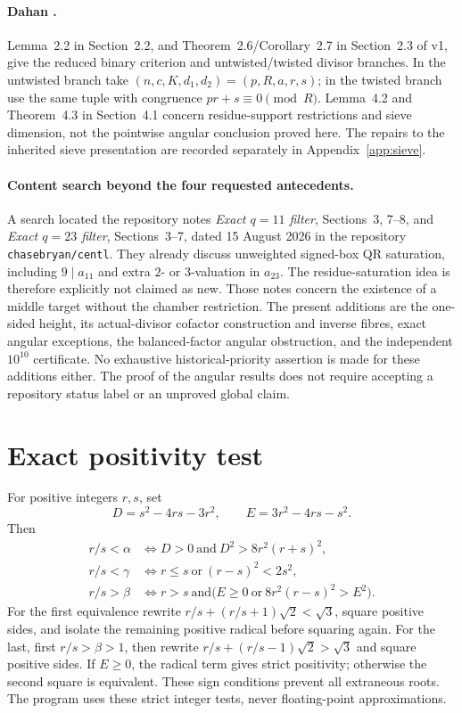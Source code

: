 \documentclass[11pt]{article}
\theoremstyle{definition}\newtheorem{definition}[theorem]{Definition}
\theoremstyle{remark}\newtheorem{remark}[theorem]{Remark}
\begin{document}
\paragraph{Dahan \cite{Dahan}.}
Lemma~2.2 in Section~2.2, and Theorem~2.6/Corollary~2.7 in Section~2.3 of v1, give the reduced binary criterion and untwisted/twisted divisor branches. In the untwisted branch take $(n,c,K,d_1,d_2)=(p,R,a,r,s)$; in the twisted branch use the same tuple with congruence $pr+s\equiv0\pmod R$. Lemma~4.2 and Theorem~4.3 in Section~4.1 concern residue-support restrictions and sieve dimension, not the pointwise angular conclusion proved here. The repairs to the inherited sieve presentation are recorded separately in Appendix~\ref{app:sieve}.

\paragraph{Content search beyond the four requested antecedents.}
A search located the repository notes \cite{Repo11,Repo23} \emph{Exact $q=11$ filter}, Sections~3, 7--8, and \emph{Exact $q=23$ filter}, Sections~3--7, dated 15 August 2026 in the repository \texttt{chasebryan/centl}. They already discuss unweighted signed-box QR saturation, including $9\mid a_{11}$ and extra $2$- or $3$-valuation in $a_{23}$. The residue-saturation idea is therefore explicitly not claimed as new. Those notes concern the existence of a middle target without the chamber restriction. The present additions are the one-sided height, its actual-divisor cofactor construction and inverse fibres, exact angular exceptions, the balanced-factor angular obstruction, and the independent $10^{10}$ certificate. No exhaustive historical-priority assertion is made for these additions either. The proof of the angular results does not require accepting a repository status label or an unproved global claim.

\appendix
\section{Exact positivity test}\label{app:positivity}
For positive integers $r,s$, set
\[
 D=s^2-4rs-3r^2,\qquad E=3r^2-4rs-s^2.
\]
Then
\begin{align*}
 r/s<\alpha
 &\iff D>0\ \text{and}\ D^2>8r^2(r+s)^2,\\
 r/s<\gamma
 &\iff r\le s\ \text{or}\ (r-s)^2<2s^2,\\
 r/s>\beta
 &\iff r>s\ \text{and}\bigl(E\ge0\ \text{or}\
                    8r^2(r-s)^2>E^2\bigr).
\end{align*}
For the first equivalence rewrite $r/s+(r/s+1)\sqrt2<\sqrt3$, square positive sides, and isolate the remaining positive radical before squaring again. For the last, first $r/s>\beta>1$, then rewrite $r/s+(r/s-1)\sqrt2>\sqrt3$ and square positive sides. If $E\ge0$, the radical term gives strict positivity; otherwise the second square is equivalent. These sign conditions prevent all extraneous roots. The program uses these strict integer tests, never floating-point approximations.
\end{document}
